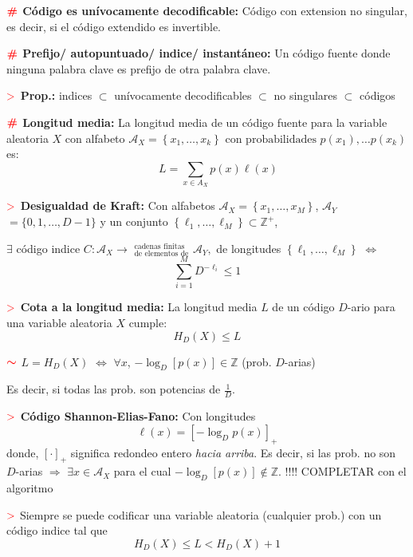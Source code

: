 \documentclass[%
 reprint,
 amsmath,amssymb,
 aps,
]{revtex4-1}
\begin{document}
\textbf{$\color{red}{\textbf{\#}}$ Código es unívocamente decodificable:}
Código con extension no singular, es decir, si el código extendido es invertible.

\textbf{$\color{red}{\textbf{\#}}$ Prefijo/ autopuntuado/ indice/ instantáneo:} 
Un código fuente donde ninguna palabra clave es prefijo de otra palabra clave.

\textbf{$\textcolor{red}{\mathbf{>}}$ Prop.:} 
indices $\subset$ unívocamente decodificables $\subset$ no singulares $\subset$ códigos 

\textbf{$\color{red}{\textbf{\#}}$ Longitud media:} 
La longitud media de un código fuente para la variable aleatoria $X$ con alfabeto $\mathcal{A}_X=\left\{x_{1}, \ldots, x_{k}\right\} \text { con probabilidades } p\left(x_{1}\right), \ldots p(x_{k})$ es:
$$
\qquad L=\sum_{x \in A_{X}} p(x) \ell(x)
$$

\textbf{$\textcolor{red}{\mathbf{>}}$ Desigualdad de Kraft:} 
Con alfabetos 
$\mathcal{A}_{X}=\left\{x_{1}, \ldots, x_{M}\right\}$, $\mathcal{A}_{Y}$
$= \{0,1, \ldots, D-1\} $ 
y un conjunto $\left\{\ell_{1}, \ldots, \ell_{M}\right\} \subset \mathbb{Z}^+$, 

$\exists$ código indice $C: \mathcal{A}_{X} \rightarrow$ $^\text{cadenas finitas}
_\text{de elementos de}$
$\mathcal{A}_{Y},$
de longitudes $\left\{\ell_{1}, \ldots, \ell_{M}\right\}$ $\Leftrightarrow$
$$
\sum_{i=1}^{M} D^{-\ell_{i}} \leq 1
$$

\textbf{$\textcolor{red}{\mathbf{>}}$ Cota a la longitud media:} 
La longitud media $L$ de un código $D$-ario para una variable aleatoria $X$ cumple: 
$$H_D(X)\leq L $$

\textbf{$\textcolor{red}{\color{red}{\boldsymbol{\sim}}}$} 
$L = H_D(X)$ $\Leftrightarrow$ 
$\forall x$, $-\log _{D}[p(x)] \in \mathbb{Z}$ (prob. $D$-arias)

Es decir, si todas las prob. son potencias de $\frac{1}{D}$.

\textbf{$\textcolor{red}{\mathbf{>}}$ Código Shannon-Elias-Fano:}
Con longitudes
$$
\ell(x)=\left[-\log _{D} p(x)\right]_{+}
$$
donde, $[\cdot]_{+}$ significa redondeo entero \textit{hacia arriba}. Es decir, si las prob. no son $D$-arias $\Rightarrow$ $\exists x \in \mathcal{A}_{X}$ para el cual $-\log _{D}[p(x)] \notin \mathbb{Z}$. !!!! COMPLETAR con el algoritmo

\textbf{$\textcolor{red}{\mathbf{>}}$} 
Siempre se puede codificar una variable aleatoria (cualquier prob.) con un código indice tal que
$$
H_{D}(X) \leq L<H_{D}(X)+1
$$
\end{document}
